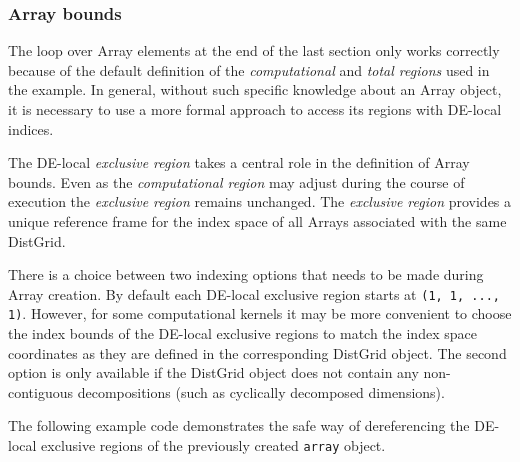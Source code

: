 
 
   \subsubsection{Array bounds}
  
   The loop over Array elements at the end of the last section only works
   correctly because of the default definition of the {\em computational} and
   {\em total regions} used in the example. In general, without such specific
   knowledge about an Array object, it is necessary to use a more formal approach
   to access its regions with DE-local indices.
  
   The DE-local {\em exclusive region} takes a central role in the definition
   of Array bounds. Even as the {\em computational region} may adjust during 
   the course of execution the {\em exclusive region} remains unchanged.
   The {\em exclusive region} provides a unique reference frame
   for the index space of all Arrays associated with the same DistGrid.
  
   There is a choice between two indexing options that needs to be made during 
   Array creation. By default each DE-local exclusive region starts at 
   {\tt (1, 1, ..., 1)}. However, for some computational kernels it may be more
   convenient to choose the index bounds of the DE-local exclusive regions to 
   match the index space coordinates as they are defined in the corresponding
   DistGrid object. The second option is only available if the DistGrid object 
   does not contain any non-contiguous decompositions (such as cyclically
   decomposed dimensions).
  
   The following example code demonstrates the safe way of dereferencing the
   DE-local exclusive regions of the previously created {\tt array} object.
  
   


